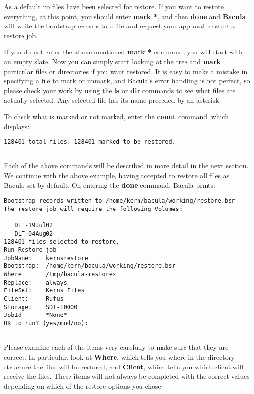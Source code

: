 As a default no files have been selected for restore. If you want to restore
everything, at this point, you should enter {\bf mark *}, and then {\bf done}
and {\bf Bacula} will write the bootstrap records to a file and request your
approval to start a restore job. 

If you do not enter the above mentioned {\bf mark *} command, you will start
with an empty slate. Now you can simply start looking at the tree and {\bf
mark} particular files or directories if you want restored. It is easy to make
a mistake in specifying a file to mark or unmark, and Bacula's error handling
is not perfect, so please check your work by using the {\bf ls} or {\bf dir}
commands to see what files are actually selected. Any selected file has its
name preceded by an asterisk. 

To check what is marked or not marked, enter the {\bf count} command, which
displays:  

\footnotesize
\begin{verbatim}
128401 total files. 128401 marked to be restored.
     
\end{verbatim}
\normalsize

Each of the above commands will be described in more detail in the next
section. We continue with the above example, having accepted to restore all
files as Bacula set by default. On entering the {\bf done} command, Bacula
prints:  

\footnotesize
\begin{verbatim}
Bootstrap records written to /home/kern/bacula/working/restore.bsr
The restore job will require the following Volumes:
   
   DLT-19Jul02
   DLT-04Aug02
128401 files selected to restore.
Run Restore job
JobName:    kernsrestore
Bootstrap:  /home/kern/bacula/working/restore.bsr
Where:      /tmp/bacula-restores
Replace:    always
FileSet:    Kerns Files
Client:     Rufus
Storage:    SDT-10000
JobId:      *None*
OK to run? (yes/mod/no):
    
\end{verbatim}
\normalsize

Please examine each of the items very carefully to make sure that they are
correct. In particular, look at {\bf Where}, which tells you where in the
directory structure the files will be restored, and {\bf Client}, which tells
you which client will receive the files. These items will not always be
completed with the correct values depending on which of the restore options
you chose. 

